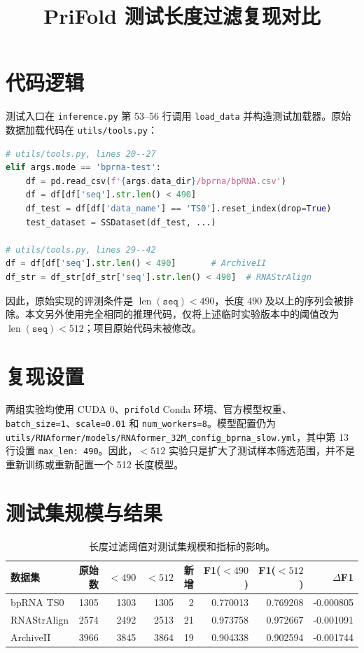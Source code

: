 \documentclass[UTF8,a4paper,11pt]{ctexart}
\title{PriFold 测试长度过滤复现对比}
\author{}
\date{}
\begin{document}
\maketitle

\section{代码逻辑}

测试入口在 \texttt{inference.py} 第 53--56 行调用 \texttt{load\_data} 并构造测试加载器。原始数据加载代码在 \texttt{utils/tools.py}：

\begin{lstlisting}[language=Python]
# utils/tools.py, lines 20--27
elif args.mode == 'bprna-test':
    df = pd.read_csv(f'{args.data_dir}/bprna/bpRNA.csv')
    df = df[df['seq'].str.len() < 490]
    df_test = df[df['data_name'] == 'TS0'].reset_index(drop=True)
    test_dataset = SSDataset(df_test, ...)

# utils/tools.py, lines 29--42
df = df[df['seq'].str.len() < 490]       # ArchiveII
df_str = df_str[df_str['seq'].str.len() < 490]  # RNAStrAlign
\end{lstlisting}

因此，原始实现的评测条件是 $\operatorname{len}(\texttt{seq})<490$，长度 490 及以上的序列会被排除。本文另外使用完全相同的推理代码，仅将上述临时实验版本中的阈值改为 $\operatorname{len}(\texttt{seq})<512$；项目原始代码未被修改。

\section{复现设置}

两组实验均使用 CUDA 0、\texttt{prifold} Conda 环境、官方模型权重、\texttt{batch\_size=1}、\texttt{scale=0.01} 和 \texttt{num\_workers=8}。模型配置仍为 \texttt{utils/RNAformer/models/RNAformer\_32M\_config\_bprna\_slow.yml}，其中第 13 行设置 \texttt{max\_len: 490}。因此，$<512$ 实验只是扩大了测试样本筛选范围，并不是重新训练或重新配置一个 512 长度模型。

\section{测试集规模与结果}

\begin{table}[h]
\centering
\small
\caption{长度过滤阈值对测试集规模和指标的影响。}
\begin{tabular}{lrrrrrrr}
\toprule
数据集 & 原始数 & $<490$ & $<512$ & 新增 & F1($<490$) & F1($<512$) & $\Delta$F1 \\
\midrule
bpRNA TS0 & 1305 & 1303 & 1305 & 2  & 0.770013 & 0.769208 & -0.000805 \\
RNAStrAlign & 2574 & 2492 & 2513 & 21 & 0.973758 & 0.972667 & -0.001091 \\
ArchiveII & 3966 & 3845 & 3864 & 19 & 0.904338 & 0.902594 & -0.001744 \\
\bottomrule
\end{tabular}
\end{table}
\end{document}
